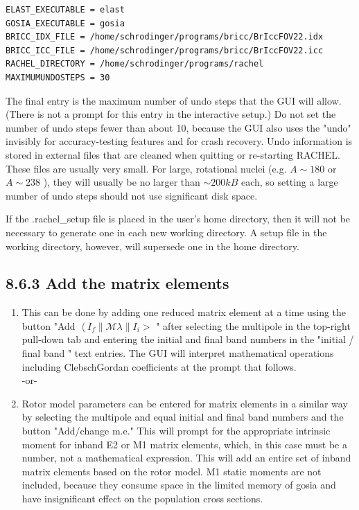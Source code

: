 \documentclass[10pt]{article}
\begin{document}
\begin{verbatim}
ELAST_EXECUTABLE = elast
GOSIA_EXECUTABLE = gosia
BRICC_IDX_FILE = /home/schrodinger/programs/bricc/BrIccFOV22.idx
BRICC_ICC_FILE = /home/schrodinger/programs/bricc/BrIccFOV22.icc
RACHEL_DIRECTORY = /home/schrodinger/programs/rachel
MAXIMUMUNDOSTEPS = 30
\end{verbatim}

The final entry is the maximum number of undo steps that the GUI will allow. (There is not a prompt for this entry in the interactive setup.) Do not set the number of undo steps fewer than about 10, because the GUI also uses the "undo" invisibly for accuracy-testing features and for crash recovery. Undo information is stored in external files that are cleaned when quitting or re-starting RACHEL. These files are usually very small. For large, rotational nuclei (e.g. $A \sim 180$ or $A \sim 238$ ), they will usually be no larger than $\sim 200 k B$ each, so setting a large number of undo steps should not use significant disk space.

If the .rachel\_setup file is placed in the user's home directory, then it will not be necessary to generate one in each new working directory. A setup file in the working directory, however, will supersede one in the home directory.

\subsection*{8.6.3 Add the matrix elements}
\begin{enumerate}
  \item This can be done by adding one reduced matrix element at a time using the button "Add $\left\langle I_{f}\|\mathcal{M} \lambda\| I_{i}>\right.$ " after selecting the multipole in the top-right pull-down tab and entering the initial and final band numbers in the "initial / final band " text entries. The GUI will interpret mathematical operations including ClebschGordan coefficients at the prompt that follows.\\
-or-
  \item Rotor model parameters can be entered for matrix elements in a similar way by selecting the multipole and equal initial and final band numbers and the button "Add/change m.e." This will prompt for the appropriate intrinsic moment for inband E2 or M1 matrix elements, which, in this case must be a number, not a mathematical expression. This will add an entire set of inband matrix elements based on the rotor model. M1 static moments are not included, because they consume space in the limited memory of gosia and have insignificant effect on the population cross sections.
\end{enumerate}
\end{document}
